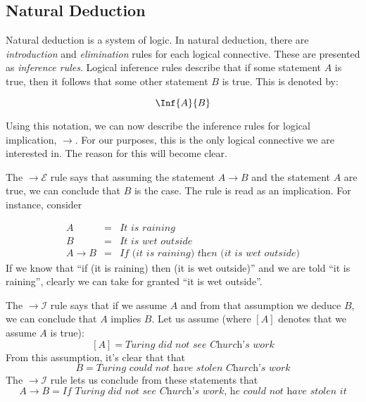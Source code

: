   \subsection{Natural Deduction}
 
  Natural deduction is a system of logic.
  In natural deduction, there are \emph{introduction} and \emph{elimination} rules for each logical connective.
  These are presented as \emph{inference rules}.
  Logical inference rules describe that if some statement $A$ is true,
  then it follows that some other statement $B$ is true.
  This is denoted by:
  
  \[
    \Inf{A}{B} 
  \]
  
  Using this notation, we can now describe the inference rules for logical implication, $\to$.
  For our purposes, this is the only logical connective we are interested in.
  The reason for this will become clear.
  
  
  The $\to\mathcal{E}$ rule says that assuming the statement $A \to B$ and the statement $A$ are true,
  we can conclude that $B$ is the case. The rule is read as an implication.
  For instance, consider 
 
  \[
  \begin{array}{lcl}
    A & = & \textit{It is raining} \\
    B & = & \textit{It is wet outside} \\
    A \to B & = & \textit{If (it is raining) then (it is wet outside)}
  \end{array}
  \]
  If we know that ``if (it is raining) then (it is wet outside)'' and we are told ``it is raining'',
  clearly we can take for granted ``it is wet outside''.
  
  The $\to\mathcal{I}$ rule says that if we assume $A$ and from that assumption we deduce $B$,
  we can conclude that $A$ implies $B$.
  Let us assume (where $[A]$ denotes that we assume $A$ is true): 
  \[
    [A] = \textit{Turing did not see Church's work} 
  \]
  From this assumption, it's clear that that 
  \[
    B = \textit{Turing could not have stolen Church's work} 
  \]
  The $\to\mathcal{I}$ rule lets us conclude from these statements that
  \[
    A \to B = \textit{If Turing did not see Church's work, he could not have stolen it}
  \]
 
